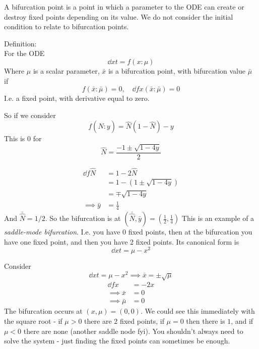 \documentclass{/home/janmebows/Documents/LatexTemplates/myassignment}
\begin{document}
A bifurcation point is a point in which a parameter to the ODE can create or destroy fixed points depending on its value. We do not consider the initial condition to relate to bifurcation points.


Definition:\\
For the ODE
\[\dd xt = f(x:\mu)\]
Where $\mu$ is a scalar parameter, $\bar{x}$ is a bifurcation point, with bifurcation value $\bar{\mu}$ 
if
\[f(\bar{x}:\bar{\mu}) = 0,\quad \dd fx (\bar{x}:\bar{\mu})= 0\]
I.e. a fixed point, with derivative equal to zero.

So if we consider
\[f(\hat{N} : y) = \hat{N}(1-\hat{N}) - y\]
This is $0$ for 
\[\hat{N} = \frac{-1\pm \sqrt{1-4y}}{2}\]

\begin{align*}
    \dd f{\hat{N}} &= 1-2\hat{N}\\
    &=1 - (1\pm \sqrt{1-4y})\\
    &= \mp \sqrt{1-4y}\\
    \implies \bar{y}&=\frac14
\end{align*}
And $\bar{\hat{N}} = 1/2$. So the bifurcation is at $(\bar{\hat{N}},\bar{y}) = (\frac12, \frac14)$
This is an example of a \textit{saddle-mode bifurcation}. I.e. you have 0 fixed points, then at the bifurcation you have one fixed point, and then you have 2 fixed points. Its canonical form is
\[\dd xt = \mu - x^2\]

Consider 
\[\dd xt = \mu - x^2 \implies \bar{x} = \pm\sqrt{\mu}\]
\begin{align*}
    \dd fx &= -2x\\
    \implies \bar{x}&=0\\
    \implies \bar{\mu}&=0
\end{align*}
The bifurcation occurs at $(x,\mu) = (0,0)$.
We could see this immediately with the square root - if $\mu>0$ there are 2 fixed points, if $\mu = 0$ then there is $1$, and if $\mu < 0$ there are none (another saddle node fyi). You shouldn't always need to solve the system - just finding the fixed points can sometimes be enough. 
\end{document}
